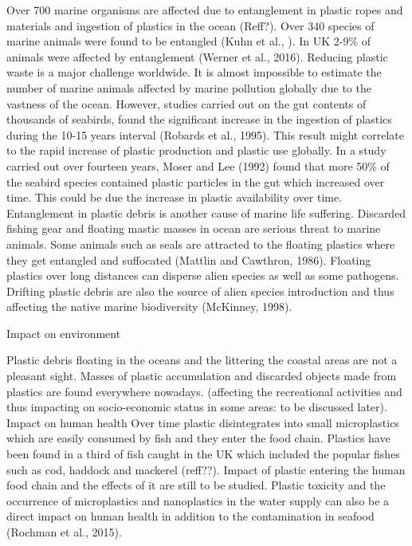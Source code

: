 \documentclass[10pt]{article}
\begin{document}
Over 700 marine organisms are affected due to entanglement in plastic ropes and materials and ingestion of plastics in the ocean (Reff?). Over 340 species of marine animals were found to be entangled (Kuhn et al., ). In UK 2-9\% of animals were affected by entanglement (Werner et al., 2016). Reducing plastic waste is a major challenge worldwide. It is almost impossible to estimate the number of marine animals affected by marine pollution globally due to the vastness of the ocean. However, studies carried out on the gut contents of thousands of seabirds, found the significant increase in the ingestion of plastics during the 10-15 years interval (Robards et al., 1995). This result might correlate to the rapid increase of plastic production and plastic use globally.  In a study carried out over fourteen years, Moser and Lee (1992) found that more 50\% of the seabird species contained plastic particles in the gut which increased over time. This could be due the increase in plastic availability over time. 
Entanglement in plastic debris is another cause of marine life suffering. Discarded fishing gear and floating mastic masses in ocean are serious threat to marine animals. Some animals such as seals are attracted to the floating plastics where they get entangled and suffocated (Mattlin and Cawthron, 1986). Floating plastics over long distances can disperse alien species as well as some pathogens. Drifting plastic debris are also the source of alien species introduction and thus affecting the native marine biodiversity (McKinney, 1998). 

Impact on environment

Plastic debris floating in the oceans and the littering the coastal areas are not a pleasant sight. Masses of plastic accumulation and discarded objects made from plastics are found everywhere nowadays. (affecting the recreational activities and thus impacting on socio-economic status in some areas: to be discussed later).
Impact on human health
Over time plastic disintegrates into small microplastics which are easily consumed by fish and they enter the food chain. Plastics have been found in a third of fish caught in the UK which included the popular fishes such as cod, haddock and mackerel (reff??). Impact of plastic entering the human food chain and the effects of it are still to be studied.  Plastic toxicity and the occurrence of microplastics and nanoplastics in the water supply can also be a direct impact on human health in addition to the contamination in seafood (Rochman et al., 2015). 
\end{document}
